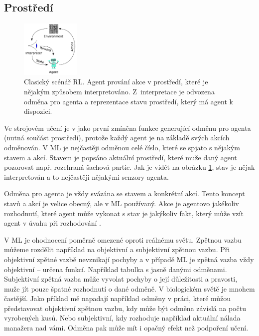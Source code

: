 \documentclass{article}
\begin{document}
\subsection{Prostředí}

\begin{figure}\centering
	\includegraphics[width=0.25\textwidth]{img/RLdiagram}
 	\caption[]{Clasický scénář RL. Agent prování akce v prostředí, které je nějakým způsobem interpretováno. Z~interpretace je odvozena odměna pro agenta a reprezentace stavu prostředí, který má agent k dispozici. \cite{pict} }\label{zavislostKnnRec}
 \end{figure}	


Ve strojovém učení je v \cite{sutton1999reinforcement} jako první zmíněna funkce generující odměnu pro agenta (nutná součást prostředí), protože každý agent je na základě svých akcích odměnován. V ML je nejčastěji odměnou celé číslo, které se spjato s nějakým stavem a akcí. Stavem je popsáno aktuální prostředí, které muže daný agent pozorovat např. rozehraná šachová partie. Jak je vidět na obrázku \ref{zavislostKnnRec}, stav je nějak interpretován a to nejčastěji nějakými senzory agenta.
 

Odměna pro agenta je vždy svázána se stavem a konkrétní akcí. Tento koncept stavů a akcí je velice obecný, ale v ML používaný. Akce je agentovo jakékoliv rozhodnutí, které agent může vykonat s stav je jakýkoliv fakt, který může vzít agent v úvahu při rozhodování \cite{sutton1999reinforcement}. 

V ML je ohodnocení poměrně omezené oproti reálnému světu. Zpětnou vazbu můžeme rozdělit například na objektivní a subjektivní zpětnou vazbu. Při objektivní zpětné vazbě nevznikají pochyby a v případě ML je zpětná vazba vždy objektivní -- určena funkcí. Například tabulka s jasně danými odměnami. Subjektivní zpětná vazba může vyvolat pochyby o její důležitosti a pravosti, muže jít pouze špatné rozhodnutí o dané odměně. V biologickém světě je mnohem častější. Jako příklad mě napadají například odměny v práci, které můžou představovat objektivní zpětnou vazbu, kdy může být odměna závislá na počtu vyrobených kusů. Nebo subjektivní, kdy rozhoduje například aktuální nálada manažera nad vámi. Odměna pak může mít i opačný efekt než podpoření učení.
\end{document}

